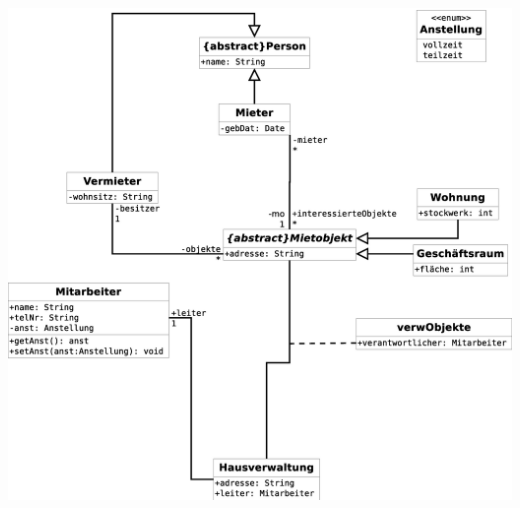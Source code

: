 \documentclass[a4paper, 12pt, margins=2cm]{homework}
\begin{document}
\newpage

  \begin{problem}
    
  \end{problem}
  \begin{solution}\hfill

    \begin{center}
      \includegraphics[scale=0.4]{Aufgabe3.eps}
    \end{center}
    
  \end{solution}

\newpage
\end{document}

